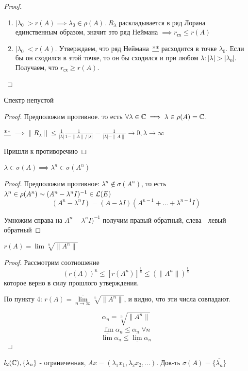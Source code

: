 \begin{proof}
\begin{enumerate}
    \item $|\lambda_0| > r(A) \implies \lambda_0 \in \rho(A)$. $R_\lambda$ раскладывается в ряд Лорана единственным образом, значит это ряд Неймана $\implies r_{\text{сх}} \leqslant r(A)$
    \item $|\lambda_0| < r(A)$. Утверждаем, что ряд Неймана~\hyperlink{thm10.1-neihman}{**} расходится в точке $\lambda_0$. Если бы он сходился в этой точке, то он бы сходился и при любом $\lambda: |\lambda| > |\lambda_0|$. Получаем, что $r_{\text{сх}} \geqslant r(A)$.
\end{enumerate}
    
\end{proof}

\begin{statement}[$5$]
    Спектр непустой
\end{statement}

\begin{proof}
    Предположим противное. то есть $\forall \lambda \in \mathbb{C} \implies \lambda \in \rho(A) = \mathbb{C}$.

    \hyperlink{thm10.1-neihman}{**} $\implies \|R_\lambda\| \leq \frac{1}{|\lambda|} \frac{1}{1-\|A\|/|\lambda|}=\frac{1}{|\lambda| - \|A\|} \to 0, \lambda \to \infty$

    Пришли к противоречию
\end{proof}

\begin{statement}[$6$]
    $\lambda \in \sigma(A) \implies \lambda^n \in \sigma(A^n)$
\end{statement}

\begin{proof}
    Предположим противное: $\lambda^n \not\in \sigma(A^n)$, то есть $\lambda^n \in \rho(A^n) \sim (A^n-\lambda^n I)^{-1} \in \mathcal{L}(E)$
    \[(A^n-\lambda^nI)=(A-\lambda I)(A^{n-1} + \ldots + \lambda^{n-1}I)\]

    Умножим справа на $A^n-\lambda^n I)^{-1}$ получим правый обратный, слева - левый обратный
\end{proof}

\begin{statement}[$7$]
    $r(A)=\lim \sqrt[n]{\|A^n\|}$
\end{statement}

\begin{proof}
    Рассмотрим соотношение $$(r(A))^n \leq \left[r(A^n)\right]^{\frac1n} \leq (\|A^n\|)^{\frac{1}{n}}$$
    которое верно в силу прошлого утверждения.

    По пункту 4: $r(A)=\overline{\lim\limits_{n \to \infty}} \sqrt[n]{\|A^n\|}$, и видно, что эти числа совпадают.

    $$\alpha_n=\sqrt[n]{\|A^n\|}$$
    $$\overline{\lim} \alpha_n \leq \alpha_n \; \forall n$$
    $$\overline{\lim} \alpha_n \leqslant \underline{\lim} \alpha_n$$
\end{proof}

\begin{exercise}
    $l_2(\mathbb{C}), \{\lambda_n\}$ - ограниченная, $Ax=(\lambda_1 x_1, \lambda_2 x_2, \ldots)$. Док-ть $\sigma(A)=\overline{\{ \lambda_n \}}$
\end{exercise}